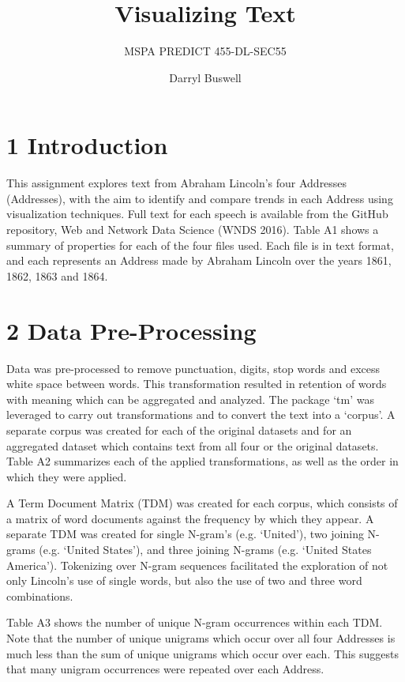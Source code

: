 \documentclass[]{article}
\title{Visualizing Text}
\subtitle{MSPA PREDICT 455-DL-SEC55}
\author{Darryl Buswell}
\date{}
\begin{document}
\maketitle

\newpage

\section{1 Introduction}\label{introduction}

This assignment explores text from Abraham Lincoln's four Addresses
(Addresses), with the aim to identify and compare trends in each Address
using visualization techniques. Full text for each speech is available
from the GitHub repository, Web and Network Data Science (WNDS 2016).
Table A1 shows a summary of properties for each of the four files used.
Each file is in text format, and each represents an Address made by
Abraham Lincoln over the years 1861, 1862, 1863 and 1864.

\section{2 Data Pre-Processing}\label{data-pre-processing}

Data was pre-processed to remove punctuation, digits, stop words and
excess white space between words. This transformation resulted in
retention of words with meaning which can be aggregated and analyzed.
The package `tm' was leveraged to carry out transformations and to
convert the text into a `corpus'. A separate corpus was created for each
of the original datasets and for an aggregated dataset which contains
text from all four or the original datasets. Table A2 summarizes each of
the applied transformations, as well as the order in which they were
applied.

A Term Document Matrix (TDM) was created for each corpus, which consists
of a matrix of word documents against the frequency by which they
appear. A separate TDM was created for single N-gram's (e.g. `United'),
two joining N-grams (e.g. `United States'), and three joining N-grams
(e.g. `United States America'). Tokenizing over N-gram sequences
facilitated the exploration of not only Lincoln's use of single words,
but also the use of two and three word combinations.

Table A3 shows the number of unique N-gram occurrences within each TDM.
Note that the number of unique unigrams which occur over all four
Addresses is much less than the sum of unique unigrams which occur over
each. This suggests that many unigram occurrences were repeated over
each Address.
\end{document}
